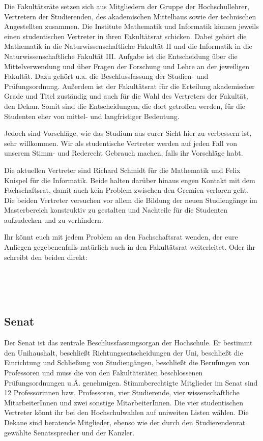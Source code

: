 Die Fakultätsräte setzen sich aus Mitgliedern der Gruppe der Hochschullehrer, Vertretern der Studierenden, des akademischen Mittelbaus sowie der technischen Angestellten zusammen.
Die Institute Mathematik und Informatik können jeweils einen studentischen Vertreter in ihren Fakultätsrat schicken.
Dabei gehört die Mathematik in die Naturwissenschaftliche Fakultät II und die Informatik in die Naturwissenschaftliche Fakultät III.
Aufgabe ist die Entscheidung über die Mittelverwendung und über Fragen der Forschung und Lehre an der jeweiligen Fakultät.
Dazu gehört u.a. die Beschlussfassung der Studien- und Prüfungsordnung.
Außerdem ist der Fakultätsrat für die Erteilung akademischer Grade und Titel zuständig und auch für die Wahl des Vertreters der Fakultät, den Dekan.
Somit sind die Entscheidungen, die dort getroffen werden, für die Studenten eher von mittel- und langfristiger Bedeutung.

Jedoch sind Vorschläge, wie das Studium aus eurer Sicht hier zu verbessern ist, sehr willkommen.
Wir als studentische Vertreter werden auf jeden Fall von unserem Stimm- und Rederecht Gebrauch machen, falls ihr Vorschläge habt.

Die aktuellen Vertreter sind Richard Schmidt für die Mathematik und Felix Knispel für die Informatik.
Beide halten darüber hinaus engen Kontakt mit dem Fachschaftsrat, damit auch kein Problem zwischen den Gremien verloren geht.
Die beiden Vertreter versuchen vor allem die Bildung der neuen Studiengänge im Masterbereich konstruktiv zu gestalten und Nachteile für die Studenten aufzudecken und zu verhindern.

Ihr könnt euch mit jedem Problem an den Fachschaftsrat wenden, der eure Anliegen gegebenenfalls natürlich auch in den Fakultätsrat weiterleitet.
Oder ihr schreibt den beiden direkt:

\\
\\
\\
    
        
\subsection{Senat}
\label{senat}

Der Senat ist das zentrale Beschlussfassungsorgan der Hochschule.
Er bestimmt den Unihaushalt, beschließt Richtungsentscheidungen der Uni, beschließt die Einrichtung und Schließung von Studiengängen, beschließt die Berufungen von Professoren und muss die von den Fakultätsräten beschlossenen Prüfungsordnungen u.Ä. genehmigen.
Stimmberechtigte Mitglieder im Senat sind 12 Professorinnen bzw. Professoren, vier Studierende, vier wissenschaftliche MitarbeiterInnen und zwei sonstige MitarbeiterInnen.
Die vier studentischen Vertreter könnt ihr bei den Hochschulwahlen auf uniweiten Listen wählen.
Die Dekane sind beratende Mitglieder, ebenso wie der durch den Studierendenrat gewählte Senatssprecher und der Kanzler.

